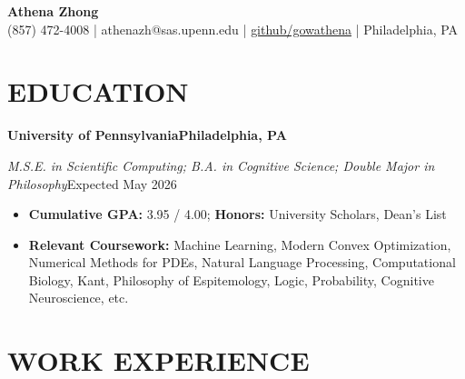 \documentclass[10pt,letterpaper]{article}
\newcommand{\ressection}[1]{\section*{#1}}
\newcommand{\resheading}[4]{%
    \textbf{#1}\hfill \textbf{#2}\par
    \textit{#3}\hfill #4\par
}
\begin{document}
\fontsize{10.5pt}{11.8pt}\selectfont

\begin{center}
    {\LARGE \textbf{Athena Zhong}} \\[2pt]
    (857) 472-4008 | athenazh@sas.upenn.edu | \href{https://github.com/gowathena}{github/gowathena} | Philadelphia, PA
\end{center}
\vspace{-8pt}

\ressection{EDUCATION}

\resheading{University of Pennsylvania}{Philadelphia, PA}{M.S.E. in Scientific Computing; B.A. in Cognitive Science; Double Major in Philosophy}{Expected May 2026}
\begin{itemize}
    \item \textbf{Cumulative GPA:} 3.95 / 4.00; \textbf{Honors:} University Scholars, Dean's List
    \item \textbf{Relevant Coursework:} Machine Learning, Modern Convex Optimization, Numerical Methods for PDEs, Natural Language Processing, Computational Biology, Kant, Philosophy of Espitemology, Logic, Probability, Cognitive Neuroscience, etc.
\end{itemize}
\ressection{WORK EXPERIENCE}
\end{document}
